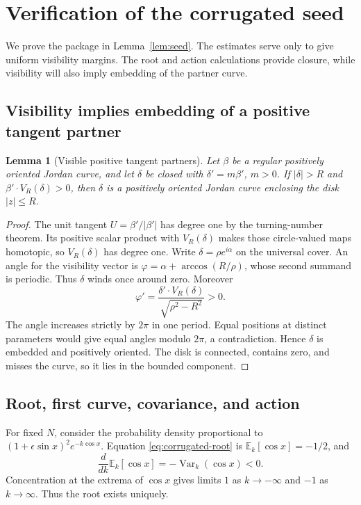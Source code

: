 \documentclass[11pt]{amsart}
\newtheorem{lemma}[theorem]{Lemma}
\theoremstyle{definition}
\theoremstyle{remark}
\numberwithin{equation}{section}
\begin{document}
\section{Verification of the corrugated seed}\label{app:seed-estimates}
We prove the package in Lemma~\ref{lem:seed}. The estimates serve only
to give uniform visibility margins. The root and action calculations
provide closure, while visibility will also imply embedding of the
partner curve.

\subsection{Visibility implies embedding of a positive tangent partner}
\begin{lemma}[Visible positive tangent partners]\label{lem:visible-partner}
Let $\beta$ be a regular positively oriented Jordan curve, and let
$\delta$ be closed with $\delta'=m\beta'$, $m>0$. If $|\delta|>R$
and $\beta'\cdot V_R(\delta)>0$, then $\delta$ is a positively oriented
Jordan curve enclosing the disk $|z|\le R$.
\end{lemma}
\begin{proof}
The unit tangent $U=\beta'/|\beta'|$ has degree one by the turning-number
theorem. Its positive scalar product with $V_R(\delta)$ makes those
circle-valued maps homotopic, so $V_R(\delta)$ has degree one.
Write $\delta=\rho e^{i\alpha}$ on the universal cover. An angle for the
visibility vector is $\varphi=\alpha+\arccos(R/\rho)$, whose second
summand is periodic. Thus $\delta$ winds once around zero. Moreover
\begin{equation}\label{eq:visibility-embedding}
 \varphi'=\frac{\delta'\cdot V_R(\delta)}{\sqrt{\rho^2-R^2}}>0.
\end{equation}
The angle increases strictly by $2\pi$ in one period. Equal positions at
distinct parameters would give equal angles modulo $2\pi$, a contradiction.
Hence $\delta$ is embedded and positively oriented. The disk is connected,
contains zero, and misses the curve, so it lies in the bounded component.
\end{proof}

\subsection{Root, first curve, covariance, and action}
For fixed $N$, consider the probability density proportional to
$(1+\epsilon\sin x)^2e^{-k\cos x}$. Equation
\eqref{eq:corrugated-root} is $\mathbb E_k[\cos x]=-1/2$, and
\[
 \frac d{dk}\mathbb E_k[\cos x]=-\operatorname{Var}_k(\cos x)<0.
\]
Concentration at the extrema of $\cos x$ gives limits $1$ as
$k\to-\infty$ and $-1$ as $k\to\infty$. Thus the root exists uniquely.
\end{document}
